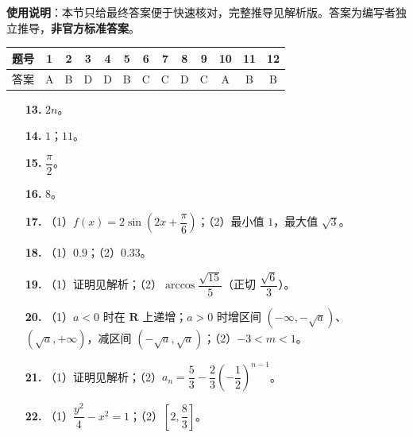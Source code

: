 
\begin{gknotice}
\textbf{使用说明}：本节只给最终答案便于快速核对，完整推导见解析版。答案为编写者独立推导，\textbf{非官方标准答案}。
\end{gknotice}

\begin{center}\begin{tabular}{ccccccccccccc}
\toprule
题号 & 1 & 2 & 3 & 4 & 5 & 6 & 7 & 8 & 9 & 10 & 11 & 12 \\
\midrule
答案 & A & B & D & D & B & C & C & D & C & A & B & B \\
\bottomrule
\end{tabular}\end{center}

\begin{itemize}[leftmargin=2.6em]
  \item[\textbf{13.}] $2n$。
  \item[\textbf{14.}] $1$；$11$。
  \item[\textbf{15.}] $\dfrac\pi2$。
  \item[\textbf{16.}] $8$。
\end{itemize}

\begin{itemize}[leftmargin=2.6em]
  \item[\textbf{17.}] （1）$f(x)=2\sin\left(2x+\dfrac\pi6\right)$；（2）最小值 $1$，最大值 $\sqrt3$。
  \item[\textbf{18.}] （1）$0.9$；（2）$0.33$。
  \item[\textbf{19.}] （1）证明见解析；（2）$\arccos\dfrac{\sqrt{15}}5$（正切 $\dfrac{\sqrt6}3$）。
  \item[\textbf{20.}] （1）$a<0$ 时在 $\mathbf R$ 上递增；$a>0$ 时增区间 $(-\infty,-\sqrt a)$、$(\sqrt a,+\infty)$，减区间 $(-\sqrt a,\sqrt a)$；（2）$-3<m<1$。
  \item[\textbf{21.}] （1）证明见解析；（2）$a_n=\dfrac53-\dfrac23\left(-\dfrac12\right)^{n-1}$。
  \item[\textbf{22.}] （1）$\dfrac{y^2}4-x^2=1$；（2）$\left[2,\dfrac83\right]$。
\end{itemize}
